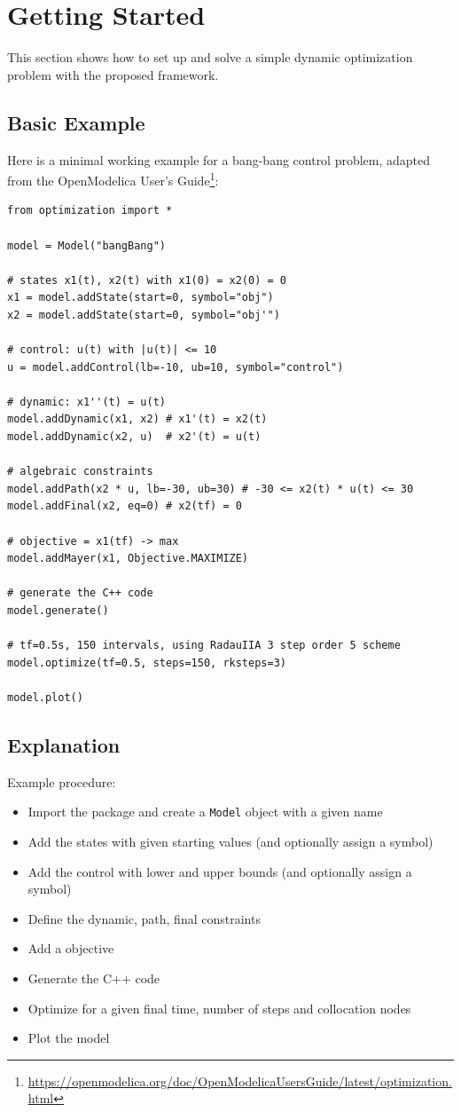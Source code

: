 \documentclass[12pt]{article}
\begin{document}
\section{Getting Started}
This section shows how to set up and solve a simple dynamic
optimization problem with the proposed framework.

\subsection{Basic Example}
Here is a minimal working example for a bang-bang control problem,
adapted from the OpenModelica User's
Guide\footnote{\url{https://openmodelica.org/doc/OpenModelicaUsersGuide/latest/optimization.html}}:

\begin{lstlisting}
from optimization import *

model = Model("bangBang")

# states x1(t), x2(t) with x1(0) = x2(0) = 0
x1 = model.addState(start=0, symbol="obj") 
x2 = model.addState(start=0, symbol="obj'")

# control: u(t) with |u(t)| <= 10
u = model.addControl(lb=-10, ub=10, symbol="control") 

# dynamic: x1''(t) = u(t)
model.addDynamic(x1, x2) # x1'(t) = x2(t)
model.addDynamic(x2, u)  # x2'(t) = u(t)

# algebraic constraints
model.addPath(x2 * u, lb=-30, ub=30) # -30 <= x2(t) * u(t) <= 30
model.addFinal(x2, eq=0) # x2(tf) = 0

# objective = x1(tf) -> max
model.addMayer(x1, Objective.MAXIMIZE) 

# generate the C++ code
model.generate() 

# tf=0.5s, 150 intervals, using RadauIIA 3 step order 5 scheme
model.optimize(tf=0.5, steps=150, rksteps=3)

model.plot()
	\end{lstlisting}

\subsection{Explanation}
Example procedure:
\begin{itemize}
	\item Import the package and create a \texttt{Model} object
	      with a given name
	\item Add the states with given starting values (and optionally
	      assign a symbol)
	\item Add the control with lower and upper bounds (and
	      optionally assign a symbol)
	\item Define the dynamic, path, final constraints
	\item Add a objective
	\item Generate the C++ code
	\item Optimize for a given final time, number of steps and
	      collocation nodes
	\item Plot the model
\end{itemize}
\end{document}
